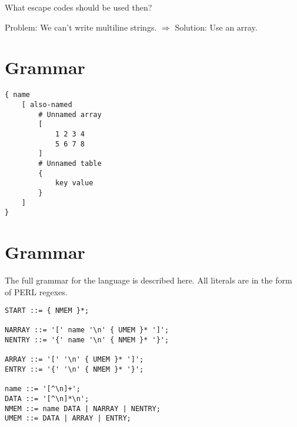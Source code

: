 \documentclass[listof=totoc]{article}
\begin{document}
What escape codes should be used then?

Problem: We can't write multiline strings.
$\Rightarrow$ Solution: Use an array.

\section{Grammar}

\begin{verbatim}
{ name
	[ also-named
		# Unnamed array
		[
			1 2 3 4
			5 6 7 8
		]
		# Unnamed table
		{
			key value
		}
	]
}
\end{verbatim}

\section{Grammar}
The full grammar for the language is described here. All literals are in the form of PERL regexes.

\begin{verbatim}
START ::= { NMEM }*;

NARRAY ::= '[' name '\n' { UMEM }* ']';
NENTRY ::= '{' name '\n' { NMEM }* '}';

ARRAY ::= '[' '\n' { UMEM }* ']';
ENTRY ::= '{' '\n' { NMEM }* '}';

name ::= '[^\n]+';
DATA ::= '[^\n]*\n';
NMEM ::= name DATA | NARRAY | NENTRY;
UMEM ::= DATA | ARRAY | ENTRY;
\end{verbatim}
\end{document}
